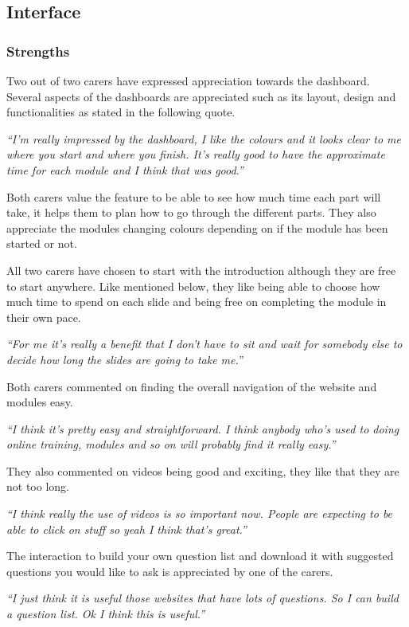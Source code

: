 \documentclass{sigchi}
\begin{document}
\subsection{Interface}
\subsubsection{Strengths}
Two out of two carers have expressed appreciation towards the dashboard. Several aspects of the dashboards are appreciated such as its layout, design and functionalities as stated in the following quote.  

\textit{“I’m really impressed by the dashboard, I like the colours and it looks clear to me where you start and where you finish. It’s really good to have the approximate time for each module and I think that was good.”}

Both carers value the feature to be able to see how much time each part will take, it helps them to plan how to go through the different parts. They also appreciate the modules changing colours depending on if the module has been started or not.

All two carers have chosen to start with the introduction although they are free to start anywhere. Like mentioned below, they like being able to choose how much time to spend on each slide and being free on completing the module in their own pace.

\textit{“For me it’s really a benefit that I don't have to sit and wait for somebody else to decide how long the slides are going to take me.”}

Both carers commented on finding the overall navigation of the website and modules easy.

\textit{“I think it’s pretty easy and straightforward. I think anybody who’s used to doing online training, modules and so on will probably find it really easy.”}

They also commented on videos being good and exciting, they like that they are not too long. 

\textit{“I think really the use of videos is so important now. People are expecting to be able to click on stuff so yeah I think that’s great.”}

The interaction to build your own question list and download it with suggested questions you would like to ask is appreciated by one of the carers. 

\textit{“I just think it is useful those websites that have lots of questions. So I can build a question list. Ok I think this is useful.”} 
\end{document}

